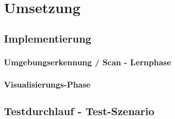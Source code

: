 

\chapter{Umsetzung}
\label{chap:Umsetzung}

\section{Implementierung} %
\label{chap:implementierung}
\subsection{Umgebungserkennung / Scan - Lernphase}
\subsection{Visualisierungs-Phase} 

\section{Testdurchlauf - Test-Szenario}
\label{chap:testdurchlauf}